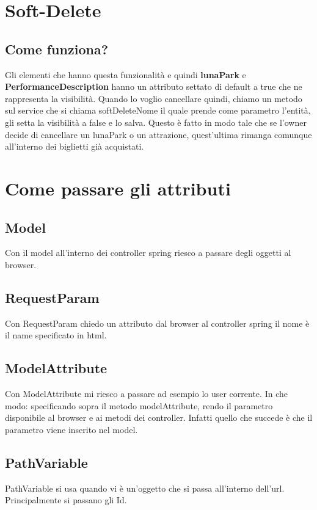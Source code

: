 \documentclass{article}
\numberwithin{equation}{subsection}
\begin{document}
\section{Soft-Delete}
\subsection{Come funziona?}
Gli elementi che hanno questa funzionalità e quindi \textbf{lunaPark} e  \textbf{PerformanceDescription} hanno un attributo settato di default a true che ne rappresenta la visibilità. Quando lo voglio cancellare quindi, chiamo un metodo sul service che si chiama softDeleteNome il quale prende come parametro l'entità, gli setta la visibilità a false e lo salva. Questo è fatto in modo tale che se l'owner decide di cancellare un lunaPark o un attrazione, quest'ultima rimanga comunque all'interno dei biglietti già acquistati.
\section{Come passare gli attributi}
\subsection{Model}
Con il model all'interno dei controller spring riesco a passare degli oggetti al browser.
\subsection{RequestParam}
Con RequestParam chiedo un attributo dal browser al controller spring il nome è il name specificato in html.
\subsection{ModelAttribute}
Con ModelAttribute mi riesco a passare ad esempio lo user corrente. In che modo: specificando sopra il metodo modelAttribute, rendo il parametro disponibile al browser e ai metodi dei controller. Infatti quello che succede è che il parametro viene inserito nel model.
\subsection{PathVariable}
PathVariable si usa quando vi è un'oggetto che si passa all'interno dell'url. Principalmente si passano gli Id.
\clearpage
\end{document}
